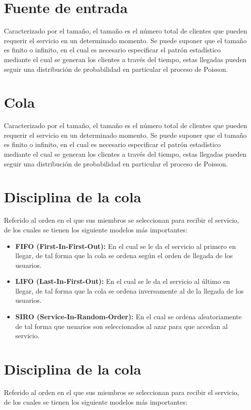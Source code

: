 \documentclass{book}
\begin{document}
\section{Fuente de entrada}
Caracterizado por el tamaño, el tamaño es el número total de clientes que pueden requerir el servicio en un determinado momento. Se puede suponer que el tamaño es finito o infinito, en el cual es necesario especificar el patrón estadístico mediante el cual se generan los clientes a través del tiempo, estas llegadas pueden seguir una distribución de probabilidad en particular el proceso de Poisson.

\section{Cola}
Caracterizado por el tamaño, el tamaño es el número total de clientes que pueden requerir el servicio en un determinado momento. Se puede suponer que el tamaño es finito o infinito, en el cual es necesario especificar el patrón estadístico mediante el cual se generan los clientes a través del tiempo, estas llegadas pueden seguir una distribución de probabilidad en particular el proceso de Poisson.

\section{Disciplina de la cola}
Referido al orden en el que sus miembros se seleccionan para recibir el servicio, de los cuales se tienen los siguiente modelos más importantes:

\begin{itemize}
	\item \textbf{FIFO (First-In-First-Out):} En el cual se le da el servicio al primero en llegar, de tal forma que la cola se ordena según el orden de llegada de los usuarios.

	\item \textbf{LIFO (Last-In-First-Out):} En el cual se le da el servicio al último en llegar, de tal forma que la cola se ordena inversamente al de la llegada de los usuarios.

	\item \textbf{SIRO (Service-In-Random-Order):} En el cual se ordena aleatoriamente de tal forma que usuarios son seleccionados al azar para que accedan al servicio.
\end{itemize}

\section{Disciplina de la cola}
Referido al orden en el que sus miembros se seleccionan para recibir el servicio, de los cuales se tienen los siguiente modelos más importantes:
\end{document}
